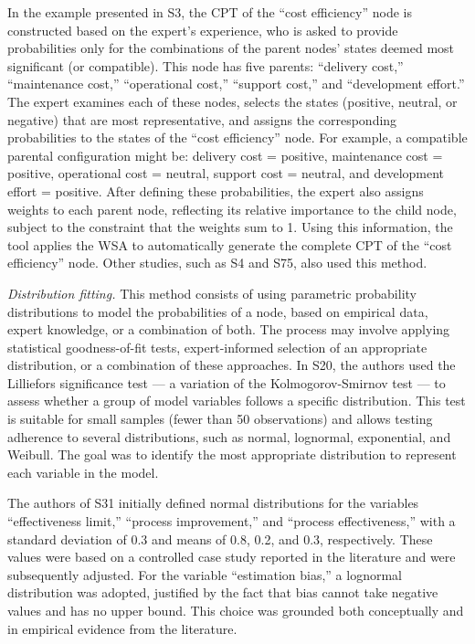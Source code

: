 In the example presented in S3, the CPT of the ``cost efficiency'' node is constructed based on the expert's experience, who is asked to provide probabilities only for the combinations of the parent nodes' states deemed most significant (or compatible). This node has five parents: ``delivery cost,'' ``maintenance cost,'' ``operational cost,'' ``support cost,'' and ``development effort.'' The expert examines each of these nodes, selects the states (positive, neutral, or negative) that are most representative, and assigns the corresponding probabilities to the states of the ``cost efficiency'' node. For example, a compatible parental configuration might be: delivery cost = positive, maintenance cost = positive, operational cost = neutral, support cost = neutral, and development effort = positive. After defining these probabilities, the expert also assigns weights to each parent node, reflecting its relative importance to the child node, subject to the constraint that the weights sum to 1. Using this information, the tool applies the WSA to automatically generate the complete CPT of the ``cost efficiency'' node. Other studies, such as S4 and S75, also used this method.

\textit{Distribution fitting.} This method consists of using parametric probability distributions to model the probabilities of a node, based on empirical data, expert knowledge, or a combination of both. The process may involve applying statistical goodness-of-fit tests, expert-informed selection of an appropriate distribution, or a combination of these approaches. In S20, the authors used the Lilliefors significance test --- a variation of the Kolmogorov-Smirnov test --- to assess whether a group of model variables follows a specific distribution. This test is suitable for small samples (fewer than 50 observations) and allows testing adherence to several distributions, such as normal, lognormal, exponential, and Weibull. The goal was to identify the most appropriate distribution to represent each variable in the model.

The authors of S31 initially defined normal distributions for the variables ``effectiveness limit,'' ``process improvement,'' and ``process effectiveness,'' with a standard deviation of 0.3 and means of 0.8, 0.2, and 0.3, respectively. These values were based on a controlled case study reported in the literature and were subsequently adjusted. For the variable ``estimation bias,'' a lognormal distribution was adopted, justified by the fact that bias cannot take negative values and has no upper bound. This choice was grounded both conceptually and in empirical evidence from the literature.

